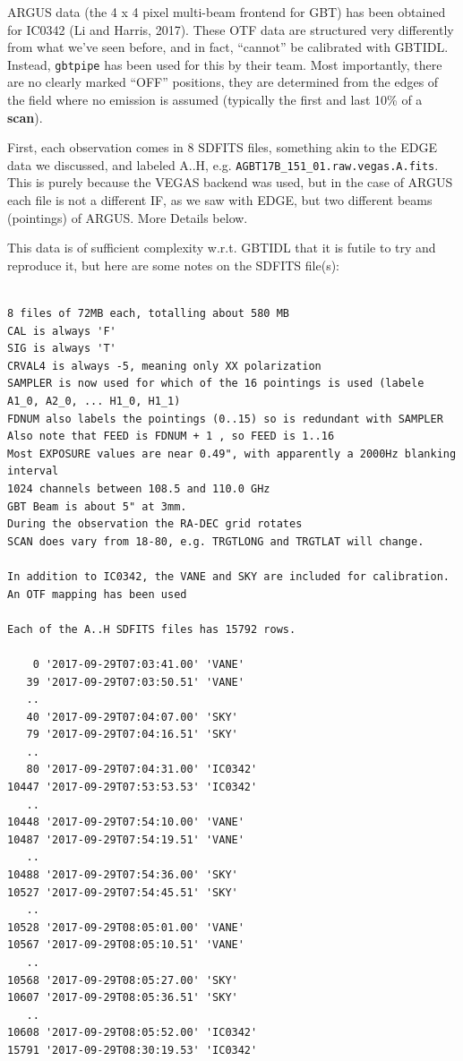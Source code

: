 \documentclass[12pt,a4paper]{article}
\begin{document}
ARGUS data (the 4 x 4 pixel multi-beam frontend for GBT) has been
obtained for IC0342 (Li and Harris, 2017). These OTF data are structured very
differently from what we've seen before, and in fact, ``cannot'' be
calibrated with GBTIDL.  Instead, {\tt gbtpipe} has been used for this by their team.
Most importantly, there are no clearly marked ``OFF'' positions, they are determined from the
edges of the field where no emission is assumed (typically the first and last 10\% of a {\bf scan}).

First, each observation comes in 8 SDFITS
files, something akin to the EDGE data we discussed, and labeled A..H,
e.g. {\tt AGBT17B\_151\_01.raw.vegas.A.fits}. This is purely because the VEGAS backend
was used, but in the case of ARGUS each file is not a different IF, as we saw with EDGE,
but two different beams (pointings) of ARGUS.  More Details below.

\bigskip
This data is of sufficient complexity w.r.t. GBTIDL that it is futile to try and reproduce it,
but here are some notes on the SDFITS file(s):

\footnotesize
\begin{verbatim}

8 files of 72MB each, totalling about 580 MB
CAL is always 'F'
SIG is always 'T'
CRVAL4 is always -5, meaning only XX polarization
SAMPLER is now used for which of the 16 pointings is used (labele A1_0, A2_0, ... H1_0, H1_1)
FDNUM also labels the pointings (0..15) so is redundant with SAMPLER
Also note that FEED is FDNUM + 1 , so FEED is 1..16
Most EXPOSURE values are near 0.49", with apparently a 2000Hz blanking interval
1024 channels between 108.5 and 110.0 GHz
GBT Beam is about 5" at 3mm.
During the observation the RA-DEC grid rotates
SCAN does vary from 18-80, e.g. TRGTLONG and TRGTLAT will change.

In addition to IC0342, the VANE and SKY are included for calibration.
An OTF mapping has been used

Each of the A..H SDFITS files has 15792 rows.

    0 '2017-09-29T07:03:41.00' 'VANE'
   39 '2017-09-29T07:03:50.51' 'VANE'
   ..
   40 '2017-09-29T07:04:07.00' 'SKY'
   79 '2017-09-29T07:04:16.51' 'SKY'
   ..
   80 '2017-09-29T07:04:31.00' 'IC0342'
10447 '2017-09-29T07:53:53.53' 'IC0342'
   ..
10448 '2017-09-29T07:54:10.00' 'VANE'
10487 '2017-09-29T07:54:19.51' 'VANE'
   ..
10488 '2017-09-29T07:54:36.00' 'SKY'
10527 '2017-09-29T07:54:45.51' 'SKY'
   ..
10528 '2017-09-29T08:05:01.00' 'VANE'
10567 '2017-09-29T08:05:10.51' 'VANE'
   ..
10568 '2017-09-29T08:05:27.00' 'SKY'
10607 '2017-09-29T08:05:36.51' 'SKY'
   ..
10608 '2017-09-29T08:05:52.00' 'IC0342'
15791 '2017-09-29T08:30:19.53' 'IC0342'

\end{verbatim}
\normalsize
\end{document}
